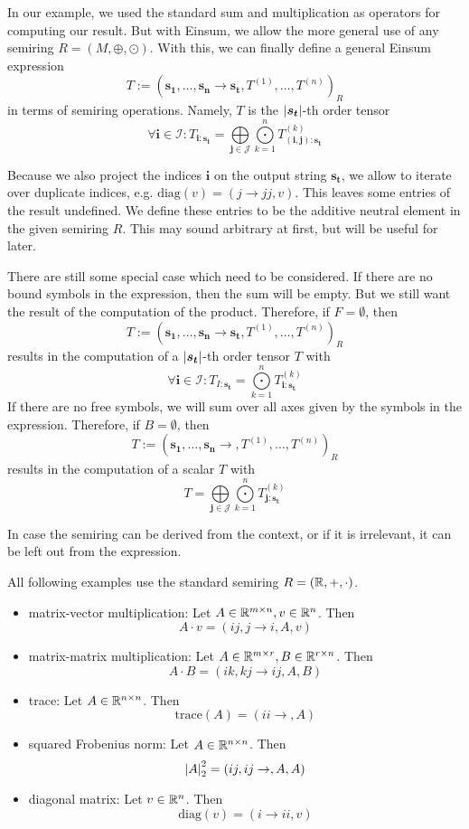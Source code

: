 \begin{definition}
    In our example, we used the standard sum and multiplication as operators for computing our result.
    But with Einsum, we allow the more general use of any semiring $R = (M, \oplus, \odot)$.
    With this, we can finally define a general Einsum expression
    $$T := (\bm{s_1},\dots,\bm{s_n} \rightarrow \bm{s_t}, T^{(1)},\dots,T^{(n)})_R$$
    in terms of semiring operations. Namely, $T$ is the $\left| \bm{s_t} \right|$-th order tensor
    $$\forall \bm{i} \in \mathcal{I}: T_{\bm{i}: \bm{s_t}} = \bigoplus\limits_{\bm{j} \in \mathcal{J}} \bigodot\limits_{k = 1}^{n} T^{(k)}_{(\bm{i},\bm{j}):\bm{s_t}}$$

    Because we also project the indices $\bm{i}$ on the output string $\bm{s_t}$, we allow to iterate over duplicate indices,
    e.g. $\text{diag}(v) = (j \rightarrow jj, v)$.
    This leaves some entries of the result undefined.
    We define these entries to be the additive neutral element in the given semiring $R$.
    This may sound arbitrary at first, but will be useful for later.

    There are still some special case which need to be considered.
    If there are no bound symbols in the expression, then the sum will be empty.
    But we still want the result of the computation of the product.
    Therefore, if $F = \emptyset$, then
    $$T := (\bm{s_1},\dots,\bm{s_n} \rightarrow \bm{s_t}, T^{(1)},\dots,T^{(n)})_R$$
    results in the computation of a $\left| \bm{s_t} \right|$-th order tensor $T$ with
    $$\forall \bm{i} \in \mathcal{I}: T_{I: \bm{s_t}} = \bigodot\limits_{k = 1}^{n} T^{(k)}_{\bm{i}:\bm{s_t}}$$
    If there are no free symbols, we will sum over all axes given by the symbols in the expression.
    Therefore, if $B = \emptyset$, then
    $$T := (\bm{s_1},\dots,\bm{s_n} \rightarrow , T^{(1)},\dots,T^{(n)})_R$$
    results in the computation of a scalar $T$ with
    $$T = \bigoplus\limits_{\bm{j} \in \mathcal{J}} \bigodot\limits_{k = 1}^{n} T^{(k)}_{\bm{j}:\bm{s_t}}$$

    In case the semiring can be derived from the context, or if it is irrelevant, it can be left out from the expression.
\end{definition}

All following examples use the standard semiring $R = (\mathbb{R}, +, \cdot)$.
\begin{itemize}
    \item matrix-vector multiplication: Let $A \in \mathbb{R}^{m \times n}, v \in \mathbb{R}^{n}$. Then
          $$A \cdot v = (ij, j \rightarrow i, A, v)$$
    \item matrix-matrix multiplication: Let $A \in \mathbb{R}^{m \times r}, B \in \mathbb{R}^{r \times n}$. Then
          $$A \cdot B = (ik, kj \rightarrow ij, A, B)$$
    \item trace: Let $A \in \mathbb{R}^{n \times n}$. Then
          $$\text{trace}(A) = (ii \rightarrow, A)$$
    \item squared Frobenius norm: Let $A \in \mathbb{R}^{n \times n}$. Then
          $$\left| A \right|_2^2 = (ij, ij \rightarrow,A,A)$$
    \item diagonal matrix: Let $v \in \mathbb{R}^{n}$. Then
          $$\text{diag}(v) = (i \rightarrow ii, v)$$
\end{itemize}